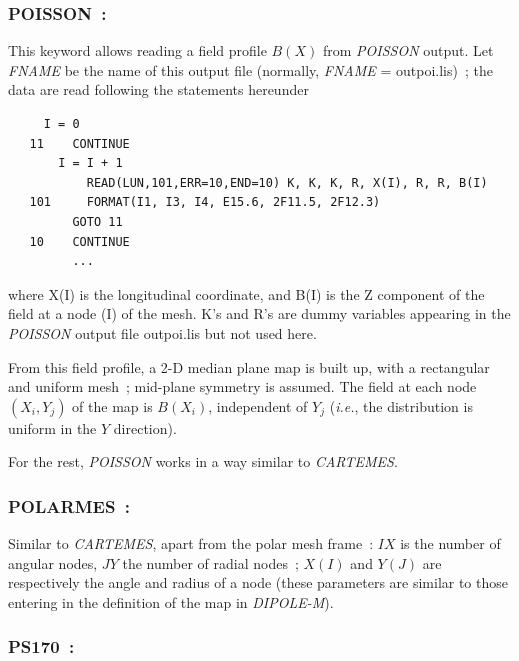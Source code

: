 \newpage

\subsubsection*{POISSON~:\POISSONTitl} \label{POISSON} 

This keyword allows reading a field profile $ B(X) $ from  \textsl{POISSON} output. 
Let \textsl{FNAME} be the name of this output file (normally,
\textsl{FNAME} = outpoi.lis)~; 
the data are read following the \FORTRAN statements hereunder 

{\footnotesize
\begin{verbatim}
	 I = 0
   11    CONTINUE
	   I = I + 1
           READ(LUN,101,ERR=10,END=10) K, K, K, R, X(I), R, R, B(I) 
   101     FORMAT(I1, I3, I4, E15.6, 2F11.5, 2F12.3)
         GOTO 11     
   10    CONTINUE
         ...
\end{verbatim}}
\medskip
 
\noindent where X(I) is the longitudinal coordinate, and B(I) is the Z
component of the field at a node (I) of the mesh. K's and R's are dummy variables 
appearing in the \textsl{POISSON} output file outpoi.lis
 but not used here. 
\bigskip

\noindent From this field profile, a 2-D median plane map is built up, with a 
rectangular and uniform mesh~; mid-plane symmetry is assumed. The field at 
each node $ (X_i,Y_j) $ of the map is $ B(X_i) $, independent of $ Y_j $
(\emph{i.e.}, the distribution is uniform in the $ Y $ direction).  
\bigskip

\noindent For the rest, \textsl{POISSON} works in a way similar to \textsl{CARTEMES}. 

\newpage
\subsubsection*{POLARMES~: \POLARMESTitl} \label{POLARMES} 

Similar to \textsl{CARTEMES}, apart from the polar 
mesh frame~: $IX$ is the number of angular nodes, $JY$ the number of 
radial nodes~; $X(I)$ and $Y(J)$ are respectively the angle and radius 
of a node (these parameters are similar to those entering in the 
definition of the map in \textsl{DIPOLE-M}).

\newpage

\subsubsection*{PS170~: \PSusoTitl} \label{PS170} 

